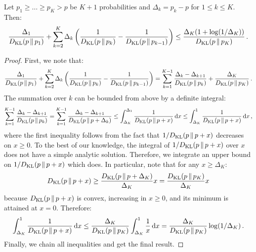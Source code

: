 \begin{lemma}
\label{lem:klucb peeling} Let $p_1 \geq \ldots \geq p_K > p$ be $K + 1$ probabilities and $\Delta_k = p_k - p$ for $1 \leq k \leq K$. Then:
\begin{align*}
  \frac{\Delta_1}{D_\mathrm{KL}(p \,\|\, p_1)} + \sum_{k = 2}^K \Delta_k
  \left(\frac{1}{D_\mathrm{KL}(p \,\|\, p_k)} - \frac{1}{D_\mathrm{KL}(p \,\|\, p_{k - 1})}\right) \leq
  \frac{\Delta_K (1 + \log(1 / \Delta_K))}{D_\mathrm{KL}(p \,\|\, p_K)}\,.
\end{align*}
\end{lemma}
\begin{proof}
First, we note that:
\begin{align*}
  \frac{\Delta_1}{D_\mathrm{KL}(p \,\|\, p_1)} + \sum_{k = 2}^K \Delta_k
  \left(\frac{1}{D_\mathrm{KL}(p \,\|\, p_k)} - \frac{1}{D_\mathrm{KL}(p \,\|\, p_{k - 1})}\right) =
  \sum_{k = 1}^{K - 1} \frac{\Delta_k - \Delta_{k + 1}}{D_\mathrm{KL}(p \,\|\, p_k)} + \frac{\Delta_K}{D_\mathrm{KL}(p \,\|\, p_K)}\,.
\end{align*}
The summation over $k$ can be bounded from above by a definite integral:
\begin{align*}
  \sum_{k = 1}^{K - 1} \frac{\Delta_k - \Delta_{k + 1}}{D_\mathrm{KL}(p \,\|\, p_k)} =
  \sum_{k = 1}^{K - 1} \frac{\Delta_k - \Delta_{k + 1}}{D_\mathrm{KL}(p \,\|\, p + \Delta_k)} \leq
  \int_{\Delta_K}^{\Delta_1} \frac{1}{D_\mathrm{KL}(p \,\|\, p + x)} \, \mathrm{d} x \leq
  \int_{\Delta_K}^1 \frac{1}{D_\mathrm{KL}(p \,\|\, p + x)} \, \mathrm{d} x\,,
\end{align*}
where the first inequality follows from the fact that $1 / D_\mathrm{KL}(p \,\|\, p + x)$ decreases on $x \geq 0$. To the best of our knowledge, the integral of $1 / D_\mathrm{KL}(p \,\|\, p + x)$ over $x$ does not have a simple analytic solution. Therefore, we integrate an upper bound on $1 / D_\mathrm{KL}(p \,\|\, p + x)$ which does. In particular, note that for any $x \geq \Delta_K$:
\begin{align*}
  D_\mathrm{KL}(p \,\|\, p + x) \geq \frac{D_\mathrm{KL}(p \,\|\, p + \Delta_K)}{\Delta_K} x = \frac{D_\mathrm{KL}(p \,\|\, p_K)}{\Delta_K} x
\end{align*}
because $D_\mathrm{KL}(p \,\|\, p + x)$ is convex, increasing in $x \geq 0$, and its minimum is attained at $x = 0$. Therefore:
\begin{align*}
  \int_{\Delta_K}^1 \frac{1}{D_\mathrm{KL}(p \,\|\, p + x)} \, \mathrm{d} x \leq
  \frac{\Delta_K}{D_\mathrm{KL}(p \,\|\, p_K)} \int_{\Delta_K}^1 \frac{1}{x} \, \mathrm{d} x =
  \frac{\Delta_K}{D_\mathrm{KL}(p \,\|\, p_K)} \log(1 / \Delta_K)\,.
\end{align*}
Finally, we chain all inequalities and get the final result.
\end{proof}
